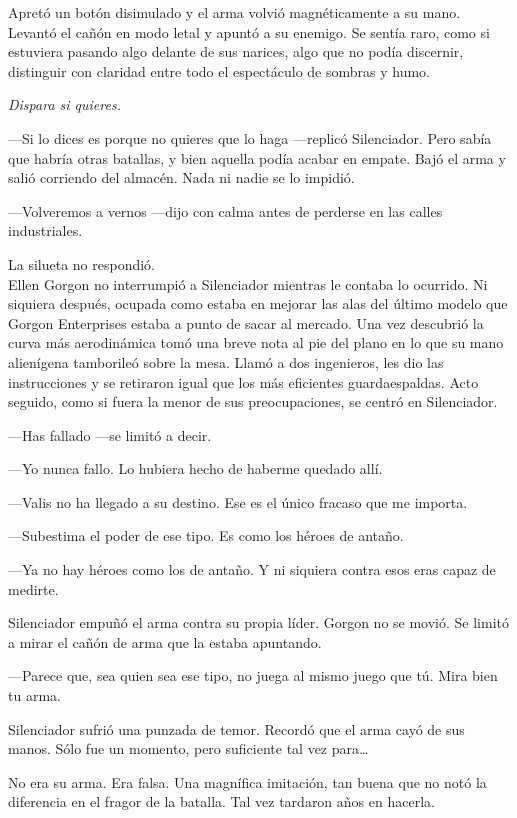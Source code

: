 Apretó un botón disimulado y el arma volvió magnéticamente a su mano. Levantó el cañón en modo letal y apuntó a su enemigo. Se sentía raro, como si estuviera pasando algo delante de sus narices, algo que no podía discernir, distinguir con claridad entre todo el espectáculo de sombras y humo.

\emph{Dispara si quieres.}

---Si lo dices es porque no quieres que lo haga ---replicó Silenciador. Pero sabía que habría otras batallas, y bien aquella podía acabar en empate. Bajó el arma y salió corriendo del almacén. Nada ni nadie se lo impidió.

---Volveremos a vernos ---dijo con calma antes de perderse en las calles industriales.

La silueta no respondió.\\

\noindent{}Ellen Gorgon no interrumpió a Silenciador mientras le contaba lo ocurrido. Ni siquiera después, ocupada como estaba en mejorar las alas del último modelo que Gorgon Enterprises estaba a punto de sacar al mercado. Una vez descubrió la curva más aerodinámica tomó una breve nota al pie del plano en lo que su mano alienígena tamborileó sobre la mesa. Llamó a dos ingenieros, les dio las instrucciones y se retiraron igual que los más eficientes guardaespaldas. Acto seguido, como si fuera la menor de sus preocupaciones, se centró en Silenciador.

---Has fallado ---se limitó a decir.

---Yo nunca fallo. Lo hubiera hecho de haberme quedado allí.

---Valis no ha llegado a su destino. Ese es el único fracaso que me importa.

---Subestima el poder de ese tipo. Es como los héroes de antaño.

---Ya no hay héroes como los de antaño. Y ni siquiera contra esos eras capaz de medirte.

Silenciador empuñó el arma contra su propia líder. Gorgon no se movió. Se limitó a mirar el cañón de arma que la estaba apuntando.

---Parece que, sea quien sea ese tipo, no juega al mismo juego que tú. Mira bien tu arma.

Silenciador sufrió una punzada de temor. Recordó que el arma cayó de sus manos. Sólo fue un momento, pero suficiente tal vez para\dots{}

No era su arma. Era falsa. Una magnífica imitación, tan buena que no notó la diferencia en el fragor de la batalla. Tal vez tardaron años en hacerla.

